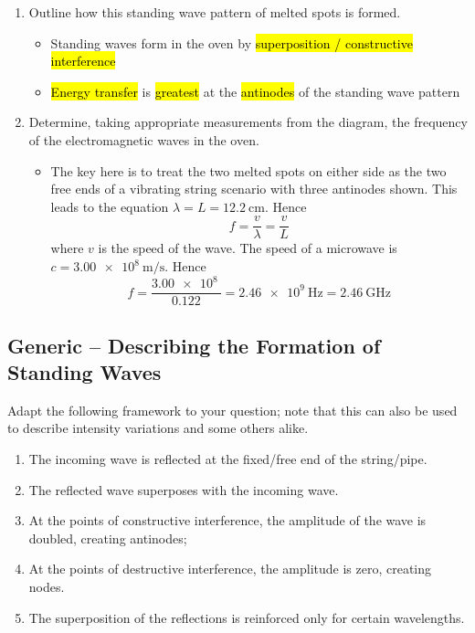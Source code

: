 \documentclass[a4paper,12pt]{article}
\begin{document}
\begin{enumerate}[label=(\alph*)]
  \item Outline how this standing wave pattern of melted spots is formed.
        \begin{itemize}
          \item Standing waves form in the oven by \hl{superposition / constructive interference}
          \item \hl{Energy transfer} is \hl{greatest} at the \hl{antinodes} of the standing wave pattern
        \end{itemize}
  \item Determine, taking appropriate measurements from the diagram, the frequency of the electromagnetic waves in the oven.
        \begin{itemize}
          \item The key here is to treat the two melted spots on either side as the two free ends of a vibrating string scenario with three antinodes shown. This leads to the equation $\lambda = L = \qty{12.2}{\cm}$. Hence
                $$f = \dfrac{v}{\lambda} = \dfrac{v}{L}$$
                where $v$ is the speed of the wave. The speed of a microwave is $c = \SI{3.00e8}{\m\per\s}$. Hence $$f = \dfrac{\SI{3.00e8}{}}{0.122} = \SI{2.46e9}{\Hz} = \SI{2.46}{\GHz}$$
        \end{itemize}
\end{enumerate}

\pagebreak

\subsection{Generic -- Describing the Formation of Standing Waves}

Adapt the following framework to your question; note that this can also be used to describe intensity variations and some others alike.

\begin{enumerate}
  \item The incoming wave is reflected at the fixed/free end of the string/pipe.
  \item The reflected wave superposes with the incoming wave.
  \item At the points of constructive interference, the amplitude of the wave is doubled, creating antinodes;
  \item At the points of destructive interference, the amplitude is zero, creating nodes.
  \item The superposition of the reflections is reinforced only for certain wavelengths.
\end{enumerate}
\end{document}
